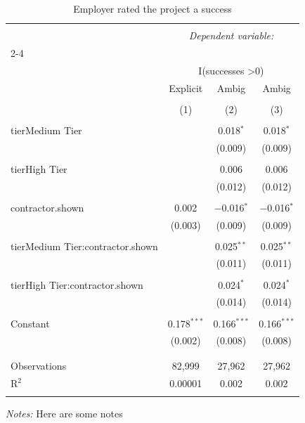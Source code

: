 
\begin{table}[!htbp] \centering 
  \caption{Employer rated the project a success} 
  \label{tab:success} 
\begin{tabular}{@{\extracolsep{5pt}}lccc} 
\\[-1.8ex]\hline 
\hline \\[-1.8ex] 
 & \multicolumn{3}{c}{\textit{Dependent variable:}} \\ 
\cline{2-4} 
\\[-1.8ex] & \multicolumn{3}{c}{I(successes \textgreater  0)} \\ 
 & Explicit & Ambig & Ambig \\ 
\\[-1.8ex] & (1) & (2) & (3)\\ 
\hline \\[-1.8ex] 
 tierMedium Tier &  & 0.018$^{*}$ & 0.018$^{*}$ \\ 
  &  & (0.009) & (0.009) \\ 
  & & & \\ 
 tierHigh Tier &  & 0.006 & 0.006 \\ 
  &  & (0.012) & (0.012) \\ 
  & & & \\ 
 contractor.shown & 0.002 & $-$0.016$^{*}$ & $-$0.016$^{*}$ \\ 
  & (0.003) & (0.009) & (0.009) \\ 
  & & & \\ 
 tierMedium Tier:contractor.shown &  & 0.025$^{**}$ & 0.025$^{**}$ \\ 
  &  & (0.011) & (0.011) \\ 
  & & & \\ 
 tierHigh Tier:contractor.shown &  & 0.024$^{*}$ & 0.024$^{*}$ \\ 
  &  & (0.014) & (0.014) \\ 
  & & & \\ 
 Constant & 0.178$^{***}$ & 0.166$^{***}$ & 0.166$^{***}$ \\ 
  & (0.002) & (0.008) & (0.008) \\ 
  & & & \\ 
\hline \\[-1.8ex] 
Observations & 82,999 & 27,962 & 27,962 \\ 
R$^{2}$ & 0.00001 & 0.002 & 0.002 \\ 
\hline 
\hline \\[-1.8ex] 
\end{tabular}
\begin{minipage}{0.9\linewidth} 
 \emph{Notes:} Here are some notes
 \end{minipage}
\end{table}
